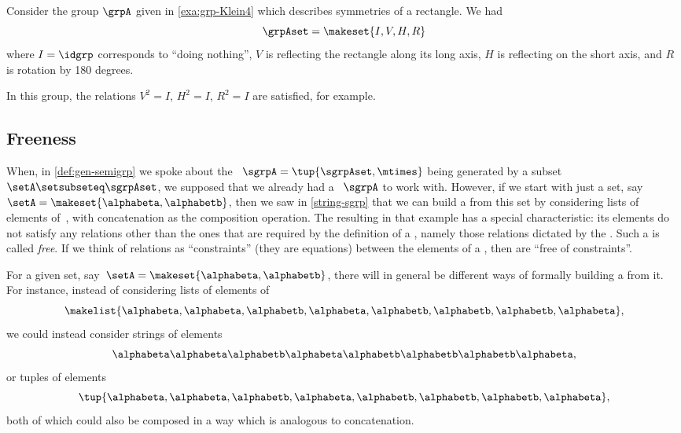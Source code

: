 \begin{example}
    Consider the group $\grpA$ given in \cref{exa:grp-Klein4} which describes symmetries of a rectangle.
    We had
    \begin{equation}
        \grpAset = \makeset{ I, V, H, R}
    \end{equation}
    where $I = \idgrp$ corresponds to ``doing nothing'', $V$ is reflecting the rectangle along its long axis, $H$ is reflecting on the short axis, and $R$ is rotation by 180 degrees.

    In this group, the relations $V^2 = I$, $H^2 = I$, $R^2 = I$ are satisfied, for example.
\end{example}

\subsection{Freeness}

When, in \cref{def:gen-semigrp} we spoke about the ~$\sgrpA = \tup{\sgrpAset, \mtimes}$ being generated by a subset~$\setA \setsubseteq \sgrpAset$, we supposed that we already had a ~$\sgrpA$ to work with.
However, if we start with just a set, say~$\setA = \makeset{ \alphabeta, \alphabetb}$, then we saw in \cref{string-sgrp} that we can build a  from this set by considering lists of elements of~\setA, with concatenation as the composition operation.
The resulting  in that example has a special characteristic: its elements do not satisfy any relations other than the ones that are required by the definition of a , namely those relations dictated by the .
Such a  is called \emph{free}.
If we think of relations as ``constraints'' (they are equations) between the elements of a , then  are ``free of constraints''.

For a given set, say~$\setA = \makeset{ \alphabeta, \alphabetb}$, there will in general be different ways of formally building a  from it.
For instance, instead of considering lists of elements of~\setA
\begin{equation}
    \makelist{\alphabeta,\alphabeta, \alphabetb, \alphabeta, \alphabetb, \alphabetb, \alphabetb, \alphabeta},
\end{equation}
we could instead consider strings of elements
\begin{equation}
    \alphabeta\alphabeta \alphabetb \alphabeta \alphabetb \alphabetb \alphabetb \alphabeta,
\end{equation}
or tuples of elements
\begin{equation}
    \tup{\alphabeta, \alphabeta, \alphabetb, \alphabeta, \alphabetb, \alphabetb, \alphabetb, \alphabeta},
\end{equation}
both of which could also be composed in a way which is analogous to concatenation.

